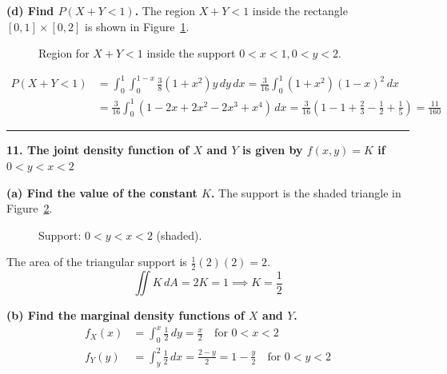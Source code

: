 \documentclass{article}
\begin{document}
\textbf{(d) Find $P(X +Y < 1)$.}
The region $X+Y<1$ inside the rectangle $[0,1]\times[0,2]$ is shown in Figure~\ref{fig:10d}.
\begin{figure}[H]
\centering
{}
\caption{Region for $X+Y<1$ inside the support $0<x<1, 0<y<2$.}
\label{fig:10d}
\end{figure}
\begin{align*}
P(X+Y < 1) &= \int_{0}^{1} \int_{0}^{1-x} \frac{3}{8}(1+x^2)y \,dy \,dx = \frac{3}{16} \int_{0}^{1} (1+x^2)(1-x)^2 \,dx \\
&= \frac{3}{16} \int_{0}^{1} (1 - 2x + 2x^2 - 2x^3 + x^4) \,dx = \frac{3}{16} \left( 1 - 1 + \frac{2}{3} - \frac{1}{2} + \frac{1}{5} \right) = \frac{11}{160}
\end{align*}

\vspace{1em}
\hrule
\vspace{1em}

\textbf{11. The joint density function of $X$ and $Y$ is given by $f(x, y) = K$ if $0 < y < x < 2$}

\textbf{(a) Find the value of the constant $K$.}
The support is the shaded triangle in Figure~\ref{fig:11}.
\begin{figure}[H]
\centering
{}
\caption{Support: $0<y<x<2$ (shaded).}
\label{fig:11}
\end{figure}
The area of the triangular support is $\frac{1}{2}(2)(2) = 2$.
$$\iint K \,dA = 2K = 1 \implies K = \frac{1}{2}$$

\textbf{(b) Find the marginal density functions of $X$ and $Y$.}
\begin{align*}
f_X(x) &= \int_{0}^{x} \frac{1}{2} \,dy = \frac{x}{2} \quad \text{for } 0 < x < 2 \\
f_Y(y) &= \int_{y}^{2} \frac{1}{2} \,dx = \frac{2-y}{2} = 1 - \frac{y}{2} \quad \text{for } 0 < y < 2
\end{align*}
\end{document}
